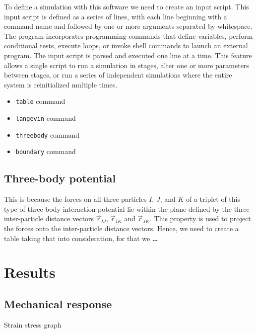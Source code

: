 To define a simulation with this software we need to create an input script.
This input script is defined as a series of lines, with each line beginning with a command name and followed by one or more arguments separated by whitespace.
The program incorporates programming commands that define variables, perform conditional tests, execute loops, or invoke shell commands to launch an external program.
The input script is parsed and executed one line at a time. 
This feature allows a single script to run a simulation in stages, alter one or more parameters between stages, or run a series of independent simulations where the entire system is reinitialized multiple times.

\begin{itemize}
    \item \verb|table| command
    \item \verb|langevin| command
    \item \verb|threebody| command
    \item \verb|boundary| command
\end{itemize}

\subsection{Three-body potential}

This is because the forces on all three particles $I$, $J$, and $K$ of a triplet of this type of three-body interaction potential lie within the plane defined by the three inter-particle distance vectors $\vec{r}_{IJ}$, $\vec{r}_{IK}$ and $\vec{r}_{JK}$.
This property is used to project the forces onto the inter-particle distance vectors.
Hence, we need to create a table taking that into consideration, for that we \textbf{\ldots}

\section{Results}

\subsection{Mechanical response}

Strain stress graph


